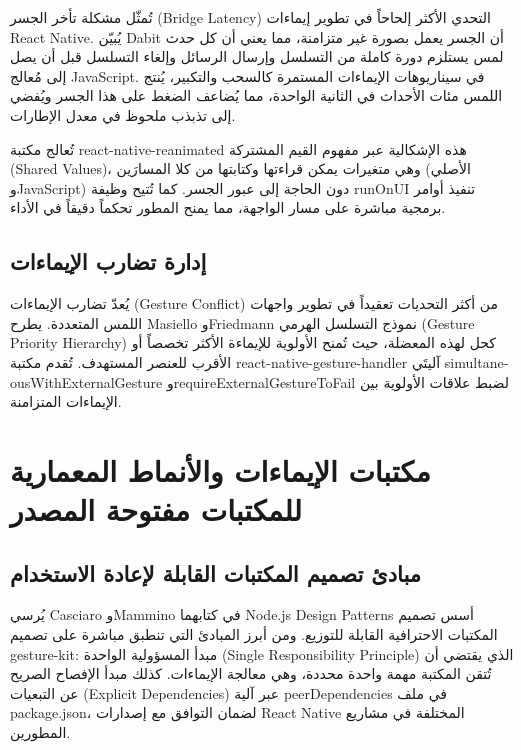 \begin{Arabic}
تُمثّل مشكلة تأخر الجسر (\textenglish{Bridge Latency}) التحدي الأكثر إلحاحاً في تطوير إيماءات \textenglish{React Native}. يُبيّن \textenglish{Dabit} \cite{dabit2019} أن الجسر يعمل بصورة غير متزامنة، مما يعني أن كل حدث لمس يستلزم دورة كاملة من التسلسل وإرسال الرسائل وإلغاء التسلسل قبل أن يصل إلى مُعالج \textenglish{JavaScript}. في سيناريوهات الإيماءات المستمرة كالسحب والتكبير، يُنتج اللمس مئات الأحداث في الثانية الواحدة، مما يُضاعف الضغط على هذا الجسر ويُفضي إلى تذبذب ملحوظ في معدل الإطارات.

تُعالج مكتبة \textenglish{react-native-reanimated} هذه الإشكالية عبر مفهوم القيم المشتركة (\textenglish{Shared Values})، وهي متغيرات يمكن قراءتها وكتابتها من كلا المسارَين (الأصلي و\textenglish{JavaScript}) دون الحاجة إلى عبور الجسر. كما تُتيح وظيفة \textenglish{runOnUI} تنفيذ أوامر برمجية مباشرة على مسار الواجهة، مما يمنح المطور تحكماً دقيقاً في الأداء.

\subsection{إدارة تضارب الإيماءات}

يُعدّ تضارب الإيماءات (\textenglish{Gesture Conflict}) من أكثر التحديات تعقيداً في تطوير واجهات اللمس المتعددة. يطرح \textenglish{Masiello} و\textenglish{Friedmann} \cite{masiello2017} نموذج التسلسل الهرمي (\textenglish{Gesture Priority Hierarchy}) كحل لهذه المعضلة، حيث تُمنح الأولوية للإيماءة الأكثر تخصصاً أو الأقرب للعنصر المستهدف. تُقدم مكتبة \textenglish{react-native-gesture-handler} آليتَي \textenglish{simultaneousWithExternalGesture} و\textenglish{requireExternalGestureToFail} لضبط علاقات الأولوية بين الإيماءات المتزامنة.

\section{مكتبات الإيماءات والأنماط المعمارية للمكتبات مفتوحة المصدر}

\subsection{مبادئ تصميم المكتبات القابلة لإعادة الاستخدام}

يُرسي \textenglish{Casciaro} و\textenglish{Mammino} \cite{casciaro2020} في كتابهما \textenglish{Node.js Design Patterns} أسس تصميم المكتبات الاحترافية القابلة للتوزيع. ومن أبرز المبادئ التي تنطبق مباشرة على تصميم \textenglish{gesture-kit}: مبدأ المسؤولية الواحدة (\textenglish{Single Responsibility Principle}) الذي يقتضي أن تُتقن المكتبة مهمة واحدة محددة، وهي معالجة الإيماءات. كذلك مبدأ الإفصاح الصريح عن التبعيات (\textenglish{Explicit Dependencies}) عبر آلية \textenglish{peerDependencies} في ملف \textenglish{package.json}، لضمان التوافق مع إصدارات \textenglish{React Native} المختلفة في مشاريع المطورين.


\end{Arabic}
